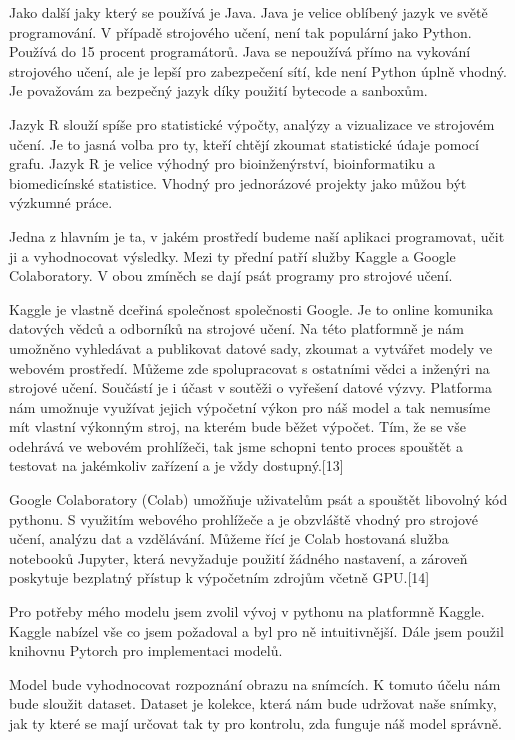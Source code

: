\documentclass[journal]{IEEEtran}
\begin{document}
Jako další jaky který se používá je Java. Java je velice oblíbený jazyk ve světě programování. V případě strojového učení, není tak populární jako Python. Používá do 15 procent programátorů. Java se nepoužívá přímo na vykování strojového učení, ale je lepší pro zabezpečení sítí, kde není Python úplně vhodný. Je považovám za bezpečný jazyk díky použití bytecode a sanboxům.

Jazyk R slouží spíše pro statistické výpočty, analýzy a vizualizace ve strojovém učení. Je to jasná volba pro ty, kteří chtějí zkoumat  statistické údaje  pomocí grafu. Jazyk R je velice výhodný pro bioinženýrství, bioinformatiku a biomedicínské statistice. Vhodný pro jednorázové projekty jako můžou být výzkumné práce.

Jedna z hlavním je ta, v jakém prostředí budeme naší aplikaci programovat, učit ji a vyhodnocovat výsledky. Mezi ty přední patří služby Kaggle a Google Colaboratory. V obou zmíněch se dají psát programy pro strojové učení. 

Kaggle je vlastně dceřiná společnost společnosti Google. Je to online komunika datových vědců a odborníků na strojové učení. Na této platformně je nám umožněno vyhledávat a publikovat datové sady, zkoumat a vytvářet modely ve webovém prostředí. Můžeme zde spolupracovat s ostatními vědci a inženýri na strojové učení. Součástí je i účast v soutěži o vyřešení datové výzvy. Platforma nám umožnuje využívat jejich výpočetní výkon pro náš model a tak nemusíme mít vlastní výkonným stroj, na kterém bude běžet výpočet. Tím, že se vše odehrává ve webovém prohlížeči, tak jsme schopni tento proces spouštět a testovat na jakémkoliv zařízení a je vždy dostupný.[13]

Google Colaboratory (Colab) umožňuje uživatelům psát a spouštět libovolný kód pythonu. S využitím webového prohlížeče a je obzvláště vhodný pro strojové učení, analýzu dat a vzdělávání. Můžeme řící je Colab hostovaná služba notebooků Jupyter, která nevyžaduje použití žádného nastavení, a zároveň poskytuje bezplatný přístup k výpočetním zdrojům včetně GPU.[14] 

Pro potřeby mého modelu jsem zvolil vývoj v pythonu na platformně Kaggle. Kaggle nabízel vše co jsem požadoval a byl pro ně intuitivnější. Dále jsem použil knihovnu Pytorch pro implementaci modelů.

Model bude vyhodnocovat rozpoznání obrazu na snímcích. K tomuto účelu nám bude sloužit dataset. Dataset je kolekce, která nám bude udržovat naše snímky, jak ty které se mají určovat tak ty pro kontrolu, zda funguje náš model správně. 
\end{document}
